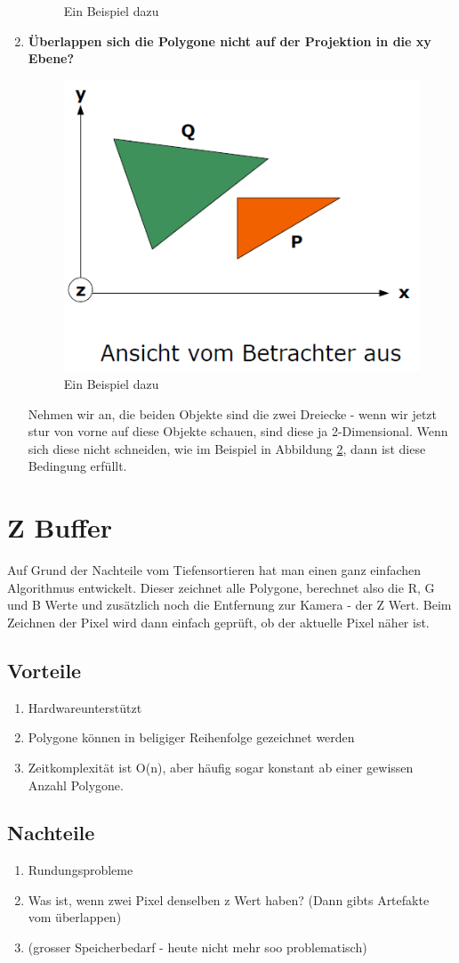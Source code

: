 \begin{enumerate}
\begin{figure}[!ht]
		\caption{Ein Beispiel dazu}
		\label{fig:tiefensortierung_4}
	\end{figure}
	\item \textbf{Überlappen sich die Polygone nicht auf der Projektion in die xy Ebene?}\\
	\begin{figure}[!ht]
		\centering
		\includegraphics[width=0.5\linewidth]{fig/tiefensortierung_5}
		\caption{Ein Beispiel dazu}
		\label{fig:tiefensortierung_5}
	\end{figure}
	Nehmen wir an, die beiden Objekte sind die zwei Dreiecke - wenn wir jetzt stur von vorne auf diese Objekte schauen, sind diese ja 2-Dimensional. Wenn sich diese nicht schneiden, wie im Beispiel in Abbildung \ref{fig:tiefensortierung_5}, dann ist diese Bedingung erfüllt.
	
\end{enumerate}
\section{Z Buffer}
Auf Grund der Nachteile vom Tiefensortieren hat man einen ganz einfachen Algorithmus entwickelt. Dieser zeichnet alle Polygone, berechnet also die R, G und B Werte und zusätzlich noch die Entfernung zur Kamera - der Z Wert. Beim Zeichnen der Pixel wird dann einfach geprüft, ob der aktuelle Pixel näher ist.
\subsection{Vorteile}
\begin{enumerate}
	\item Hardwareunterstützt
	\item Polygone können in beligiger Reihenfolge gezeichnet werden
	\item Zeitkomplexität ist O(n), aber häufig sogar konstant ab einer gewissen Anzahl Polygone.
\end{enumerate}
\subsection{Nachteile}
\begin{enumerate}
	\item Rundungsprobleme
	\item Was ist, wenn zwei Pixel denselben z Wert haben? (Dann gibts Artefakte vom überlappen)
	\item (grosser Speicherbedarf - heute nicht mehr soo problematisch)
\end{enumerate}
